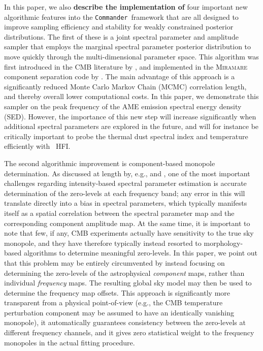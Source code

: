 \documentclass[twocolumn]{aa}
\def\commander{\texttt{Commander}}
\begin{document}
In this paper, we also \textbf{describe the implementation of}
four important new algorithmic
features into the \commander\ framework that are all designed to
improve sampling efficiency and stability for weakly constrained
posterior distributions. The first of these is a joint spectral
parameter and amplitude sampler that employs the marginal
spectral parameter posterior distribution to move quickly through the
multi-dimensional parameter space. This algorithm was first introduced
in the CMB literature by \citet{2009MNRAS.392..216S}, and implemented
in the \textsc{Miramare} component separation code by
\citet{stivoli:2010}. The main advantage of this approach is a
significantly reduced Monte Carlo Markov Chain (MCMC) correlation
length, and thereby overall lower computational costs. In this paper,
we demonstrate this sampler on the peak frequency of the AME emission spectral energy density (SED). However,
the importance of this new step will increase significantly when
additional spectral parameters are explored in the future, and will for
instance be critically important to probe the thermal dust spectral
index and temperature efficiently with \Planck\ HFI.

The second algorithmic improvement is component-based monopole
determination. As discussed at length by, e.g., \citet{planck2014-a12}
and \citet{wehus2014}, one of the most important challenges regarding
intensity-based spectral parameter estimation is accurate
determination of the zero-levels at each frequency band; any error in
this will translate directly into a bias in spectral parameters, which
typically manifests itself as a spatial correlation between the
spectral parameter map and the corresponding component amplitude
map. At the same time, it is important to note that few, if any, CMB
experiments actually have sensitivity to the true sky monopole, and
they have therefore typically instead resorted to morphology-based
algorithms to determine meaningful zero-levels. In this paper, we
point out that this problem may be entirely circumvented by instead
focusing on determining the zero-levels of the astrophysical
\emph{component} maps, rather than individual \emph{frequency}
maps. The resulting global sky model may then be used to determine the
frequency map offsets. This approach is significantly more transparent from a
physical point-of-view (e.g., the CMB temperature perturbation component may be assumed to have
an identically vanishing monopole), it automatically guarantees consistency between
the zero-levels at different frequency channels, and it gives zero
statistical weight to the frequency monopoles in the actual fitting
procedure.
\end{document}
